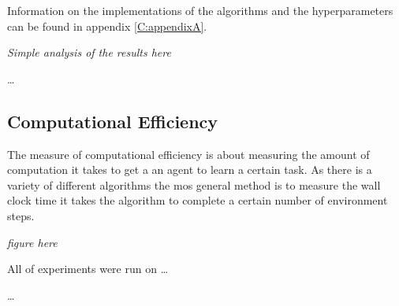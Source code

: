 Information on the implementations of the algorithms and the hyperparameters can be found in appendix \ref{C:appendixA}.

\textit{Simple analysis of the results here}

\dots

\subsection{Computational Efficiency}

The measure of computational efficiency is about measuring the amount of computation it takes to get a an agent to learn a certain task. As there is a variety of different algorithms the mos general method is to measure the wall clock time it takes the algorithm to complete a certain number of environment steps.

\textit{figure here}

All of experiments were run on \dots

\dots
